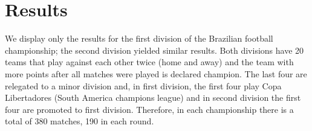 \documentclass[journal,article,accept,moreauthors,pdftex,12pt,a4paper]{mdpi}
\begin{document}
\section{Results}
\label{sec::results}

We display only the results for the first division of the Brazilian football championship; the second
division yielded similar results.
Both divisions have 20 teams that play against each other twice (home and away) and the team with more points after all matches were played is declared champion.
The last four are relegated to a minor division and, in first division, the first four play Copa Libertadores (South America champions league) and in second division the first four are promoted to first division.
Therefore, in each championship there is a total of 380 matches, 190 in each round.



\end{document}
